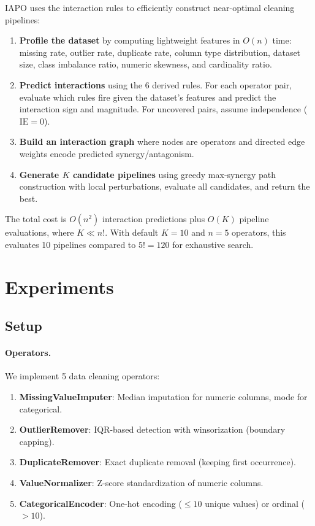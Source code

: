 \documentclass[preprint]{article}
\newcommand{\ie}{\text{IE}}
\begin{document}
IAPO uses the interaction rules to efficiently construct near-optimal cleaning pipelines:

\begin{enumerate}[nosep]
\item \textbf{Profile the dataset} by computing lightweight features in $O(n)$ time: missing rate, outlier rate, duplicate rate, column type distribution, dataset size, class imbalance ratio, numeric skewness, and cardinality ratio.
\item \textbf{Predict interactions} using the 6 derived rules. For each operator pair, evaluate which rules fire given the dataset's features and predict the interaction sign and magnitude. For uncovered pairs, assume independence ($\ie = 0$).
\item \textbf{Build an interaction graph} where nodes are operators and directed edge weights encode predicted synergy/antagonism.
\item \textbf{Generate $K$ candidate pipelines} using greedy max-synergy path construction with local perturbations, evaluate all candidates, and return the best.
\end{enumerate}

The total cost is $O(n^2)$ interaction predictions plus $O(K)$ pipeline evaluations, where $K \ll n!$. With default $K = 10$ and $n = 5$ operators, this evaluates 10 pipelines compared to $5! = 120$ for exhaustive search.

\section{Experiments}
\label{sec:experiments}

\subsection{Setup}

\paragraph{Operators.} We implement 5 data cleaning operators:
\begin{enumerate}[nosep]
\item \textbf{MissingValueImputer}: Median imputation for numeric columns, mode for categorical.
\item \textbf{OutlierRemover}: IQR-based detection with winsorization (boundary capping).
\item \textbf{DuplicateRemover}: Exact duplicate removal (keeping first occurrence).
\item \textbf{ValueNormalizer}: Z-score standardization of numeric columns.
\item \textbf{CategoricalEncoder}: One-hot encoding ($\leq 10$ unique values) or ordinal ($> 10$).
\end{enumerate}
\end{document}
